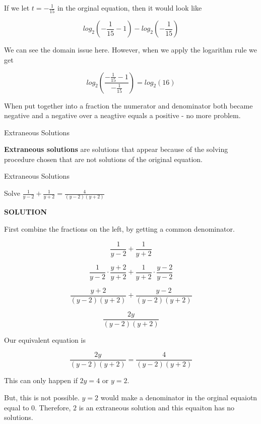 \documentclass{ximera}
\begin{document}
If we let $t = -\frac{1}{15}$ in the orginal equation, then it would look like 


\[    log_2\left(-\frac{1}{15}-1\right) - log_2\left(-\frac{1}{15}\right)   \]

We can see the domain issue here.  However, when we apply the logarithm rule we get



\[   log_2\left(\frac{-\frac{1}{15}-1}{-\frac{1}{15}}\right)    = log_2(16)  \]


When put together into a fraction the numerator and denominator both became negative and a negative over a neagtive equals a positive - no more problem.





\begin{definition} Extraneous Solutions

\textbf{Extraneous solutions} are solutions that appear because of the solving procedure chosen that are not solutions of the original equation.

\end{definition}








\begin{example} Extraneous Solutions


Solve $\frac{1}{y-2} + \frac{1}{y+2} = \frac{4}{(y-2)(y+2)}$


\textbf{\textcolor{purple!50!blue!90!black}{SOLUTION}}



First combine the fractions on the left, by getting a common denominator.



\[    \frac{1}{y-2} + \frac{1}{y+2}        \]

\[    \frac{1}{y-2} \cdot \frac{y+2}{y+2} + \frac{1}{y+2}  \cdot \frac{y-2}{y-2}       \]

\[    \frac{y+2}{(y-2)(y+2)} + \frac{y-2}{(y-2)(y+2)}      \]

\[    \frac{2y}{(y-2)(y+2)}     \]

Our equivalent equation is


\[    \frac{2y}{(y-2)(y+2)}   = \frac{4}{(y-2)(y+2)}   \]


This can only happen if $2y = 4$ or $y = 2$.

But, this is not possible.  $y=2$ would make a denominator in the orginal equaiotn equal to $0$.  Therefore, $2$ is an extraneous solution and this equaiton has no solutions.


\end{example}
\end{document}
